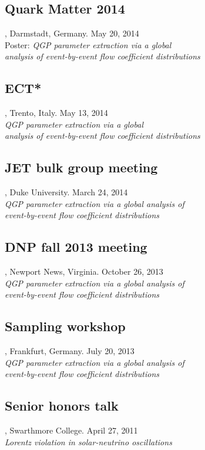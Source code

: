 \documentclass[letterpaper,10pt]{article}
\begin{document}
\subsection{Quark Matter 2014}, Darmstadt, Germany. \hfill May 20, 2014 \\
Poster: \emph{QGP parameter extraction via a global \\ analysis of event-by-event flow coefficient distributions}

\subsection{ECT*}, Trento, Italy. \hfill May 13, 2014 \\
\emph{QGP parameter extraction via a global \\ analysis of event-by-event flow coefficient distributions}

\subsection{JET bulk group meeting}, Duke University. \hfill March 24, 2014 \\
\emph{QGP parameter extraction via a global analysis of \\ event-by-event flow coefficient distributions}

\subsection{DNP fall 2013 meeting}, Newport News, Virginia. \hfill October 26, 2013 \\
\emph{QGP parameter extraction via a global analysis of \\ event-by-event flow coefficient distributions}

\subsection{Sampling workshop}, Frankfurt, Germany. \hfill July 20, 2013 \\
\emph{QGP parameter extraction via a global analysis of \\ event-by-event flow coefficient distributions}

\subsection{Senior honors talk}, Swarthmore College. \hfill April 27, 2011 \\
\emph{Lorentz violation in solar-neutrino oscillations}
\end{document}

